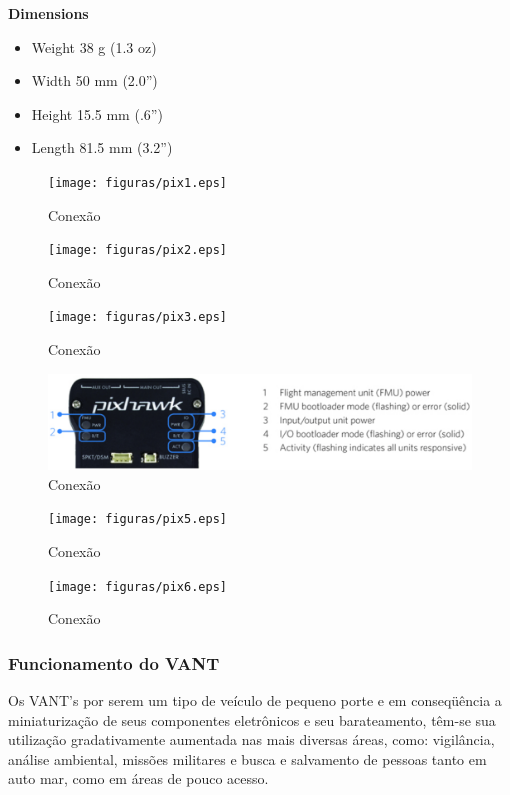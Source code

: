 \textbf{Dimensions}
\begin{itemize}
\item Weight 38 g (1.3 oz)
\item Width 50 mm (2.0”)
\item Height 15.5 mm (.6”)
\item Length 81.5 mm (3.2”)
\end{itemize}

\begin{figure}[H]
	\centering
	  \texttt{[image: figuras/pix1.eps]}
	\caption{Conexão}
	\label{fig:pix1}
\end{figure}

\begin{figure}[H]
	\centering
	  \texttt{[image: figuras/pix2.eps]}
	\caption{Conexão}
	\label{fig:pix2}
\end{figure}

\begin{figure}[H]
	\centering
	  \texttt{[image: figuras/pix3.eps]}
	\caption{Conexão}
	\label{fig:pix3}
\end{figure}

\begin{figure}[H]
	\centering
	  \includegraphics[keepaspectratio=true,scale=0.6]{figuras/pix4.eps}
	\caption{Conexão}
	\label{fig:pix4}
\end{figure}

\begin{figure}[H]
	\centering
	  \texttt{[image: figuras/pix5.eps]}
	\caption{Conexão}
	\label{fig:pix5}
\end{figure}

\begin{figure}[H]
	\centering
	  \texttt{[image: figuras/pix6.eps]}
	\caption{Conexão}
	\label{fig:pix6}
\end{figure}


\subsubsection{Funcionamento do VANT}

Os VANT's por serem um tipo de veículo de pequeno porte e em conseqüência a miniaturização de seus componentes eletrônicos e seu barateamento, têm-se sua utilização gradativamente aumentada nas mais diversas áreas, como: vigilância, análise ambiental, missões militares e busca e salvamento de pessoas tanto em auto mar, como em áreas de pouco acesso. \cite{Branco}

